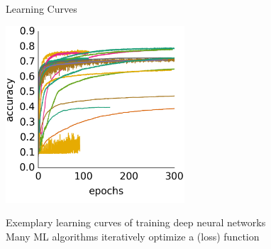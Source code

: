 \begin{frame}[c,fragile]{Learning Curves}

\centering
\includegraphics[width=0.5\textwidth]{images/learning_curves}

Exemplary learning curves of training deep neural networks\\
Many ML algorithms iteratively optimize a (loss) function

\end{frame}

